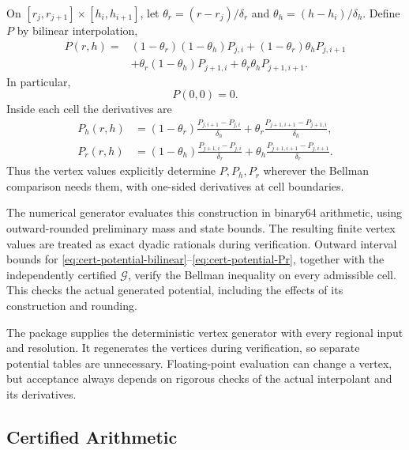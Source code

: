\documentclass[11pt]{article}
\theoremstyle{definition}
\theoremstyle{remark}
\begin{document}
On $[r_j,r_{j+1}]\times[h_i,h_{i+1}]$, let
$\theta_r=(r-r_j)/\delta_r$ and $\theta_h=(h-h_i)/\delta_h$.
Define $P$ by bilinear interpolation,
\begin{equation}\label{eq:cert-potential-bilinear}
\begin{aligned}
 P(r,h)={}&(1-\theta_r)(1-\theta_h)P_{j,i}
 +(1-\theta_r)\theta_h P_{j,i+1}\\
 &+\theta_r(1-\theta_h)P_{j+1,i}
 +\theta_r\theta_h P_{j+1,i+1}.
\end{aligned}
\end{equation}
In particular,
\begin{equation}\label{eq:cert-potential-origin}
 P(0,0)=0.
\end{equation}
Inside each cell the derivatives are
\begin{align}
 P_h(r,h)&=(1-\theta_r)\frac{P_{j,i+1}-P_{j,i}}{\delta_h}
          +\theta_r\frac{P_{j+1,i+1}-P_{j+1,i}}{\delta_h},
 \label{eq:cert-potential-Ph}\\
 P_r(r,h)&=(1-\theta_h)\frac{P_{j+1,i}-P_{j,i}}{\delta_r}
          +\theta_h\frac{P_{j+1,i+1}-P_{j,i+1}}{\delta_r}.
 \label{eq:cert-potential-Pr}
\end{align}
Thus the vertex values explicitly determine $P,P_h,P_r$ wherever
the Bellman comparison needs them, with one-sided derivatives at
cell boundaries.

The numerical generator evaluates this construction in binary64 arithmetic,
using outward-rounded preliminary mass and state bounds.  The resulting
finite vertex values are treated as exact dyadic rationals during
verification.  Outward interval bounds for
\eqref{eq:cert-potential-bilinear}--\eqref{eq:cert-potential-Pr}, together
with the independently certified $\mathcal G$, verify the Bellman
inequality on every admissible cell.  This checks the actual generated
potential, including the effects of its construction and rounding.

The package supplies the deterministic vertex generator with every
regional input and resolution.  It regenerates the vertices during
verification, so separate potential tables are unnecessary.  Floating-point
evaluation can change a vertex, but acceptance always depends on rigorous
checks of the actual interpolant and its derivatives.

\subsection{Certified Arithmetic}
\label{app:cert-arithmetic}
\end{document}
